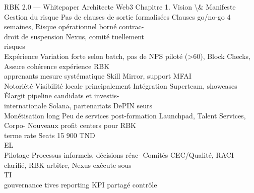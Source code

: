 \documentclass[12pt,landscape,a4paper]{article}
\begin{document}
RBK 2.0 — Whitepaper Architecte Web3                                                                       Chapitre 1. Vision \textbackslash{}& Manifeste\\
\vspace{0.5em}
\vspace{0.5em}
\vspace{0.5em}
Gestion du risque    Pas de clauses de sortie formalisées Clauses go/no-go 4 semaines, Risque opérationnel borné contrac-\\
droit de suspension Nexus, comité tuellement\\
risques\\
Expérience           Variation forte selon batch, pas de NPS piloté (\textgreater{}60), Block Checks, Assure cohérence expérience RBK\\
apprenants           mesure systématique                 Skill Mirror, support MFAI\\
Notoriété            Visibilité locale principalement    Intégration Superteam, showcases Élargit pipeline candidats et investis-\\
internationale                                           Solana, partenariats DePIN       seurs\\
Monétisation long    Peu de services post-formation      Launchpad, Talent Services, Corpo- Nouveaux profit centers pour RBK\\
terme                                                    rate Seats 15 900 TND\\
\vspace{0.5em}
\vspace{0.5em}
\vspace{0.5em}
\vspace{0.5em}
EL\\
Pilotage             Processus informels, décisions réac- Comités CEC/Qualité, RACI clarifié, RBK arbitre, Nexus exécute sous\\
\vspace{0.5em}
\vspace{0.5em}
\vspace{0.5em}
\vspace{0.5em}
TI\\
gouvernance          tives                                reporting KPI partagé               contrôle\\
\vspace{0.5em}
\vspace{0.5em}
\vspace{0.5em}
\vspace{0.5em}
\end{document}
